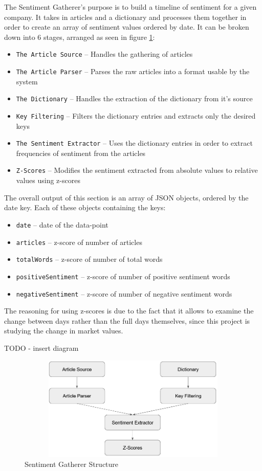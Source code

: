The Sentiment Gatherer's purpose is to build a timeline of sentiment for a given company. It takes in articles and a dictionary and processes them together in order to create an array of sentiment values ordered by date. It can be broken down into 6 stages, arranged as seen in figure \ref{fig:sentimentgathererstructure}:
\begin{itemize}
    \item \texttt{The Article Source} -- Handles the gathering of articles
    \item \texttt{The Article Parser} -- Parses the raw articles into a format usable by the system
    \item \texttt{The Dictionary} -- Handles the extraction of the dictionary from it's source
    \item \texttt{Key Filtering} -- Filters the dictionary entries and extracts only the desired keys
    \item \texttt{The Sentiment Extractor} -- Uses the dictionary entries in order to extract frequencies of sentiment from the articles
    \item \texttt{Z-Scores} -- Modifies the sentiment extracted from absolute values to relative values using z-scores
\end{itemize}

The overall output of this section is an array of JSON objects, ordered by the date key. Each of these objects containing the keys:
\begin{itemize}
    \item \texttt{date} -- date of the data-point
    \item \texttt{articles} -- z-score of number of articles
    \item \texttt{totalWords} -- z-score of number of total words
    \item \texttt{positiveSentiment} -- z-score of number of positive sentiment words
    \item \texttt{negativeSentiment} -- z-score of number of negative sentiment words
\end{itemize}
The reasoning for using z-scores is due to the fact that it allows to examine the change between days rather than the full days themselves, since this project is studying the change in market values.

TODO - insert diagram

\begin{figure}[h]
    \centering
    \includegraphics[width=15cm,height=5cm,keepaspectratio]{design/SentimentGathererStructure.png}
    \caption{Sentiment Gatherer Structure}
    \label{fig:sentimentgathererstructure}
\end{figure}

